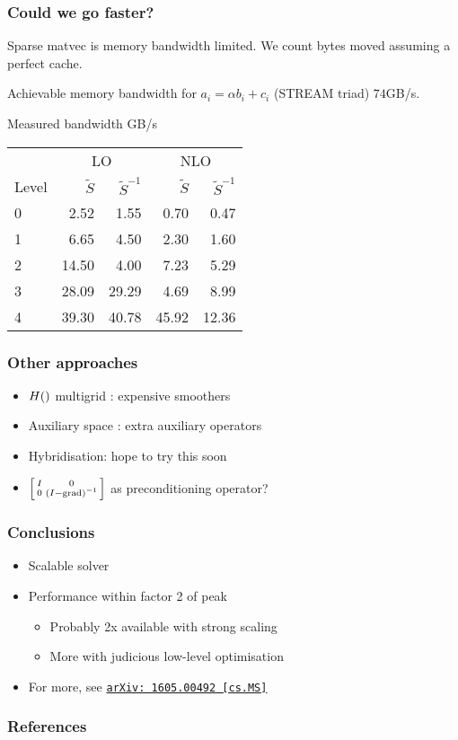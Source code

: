 \documentclass[presentation]{beamer}
\DeclareMathOperator{\grad}{grad}
\let\div\relax
\DeclareMathOperator{\div}{div}
\newcommand{\arxivlink}[2]{%
  \href{http://www.arxiv.org/abs/#1}%
  {{\small\texttt{arXiv:\,#1\,[#2]}}}%
}
\begin{document}
\begin{frame}
  \frametitle{Could we go faster?}
  Sparse matvec is memory bandwidth limited.  We count bytes moved
  assuming a perfect cache.

  Achievable memory bandwidth for $a_i = \alpha b_i + c_i$ (STREAM triad) $74$GB/s.

  \begin{block}{Measured bandwidth GB/s}
    \begin{center}
      \begin{tabular}{lrrrr}
        & \multicolumn{2}{c}{LO} & \multicolumn{2}{c}{NLO}\\
        Level & $\tilde{S}$ & $\tilde{S}^{-1}$ & $\tilde{S}$ & $\tilde{S}^{-1}$\\
        0  &   2.52 &   1.55 &    0.70 &   0.47\\
        1  &   6.65 &   4.50 &    2.30 &   1.60\\
        2  &  14.50 &   4.00 &    7.23 &   5.29\\
        3  &  28.09 &  29.29 &    4.69 &   8.99\\
        4  &  39.30 &  40.78 &   45.92 &  12.36\\
      \end{tabular}
    \end{center}
  \end{block}
\end{frame}

\begin{frame}
  \frametitle{Other approaches}
  \begin{itemize}
  \item $H(\div)$ multigrid \parencite{Arnold:2000}: expensive smoothers
  \item Auxiliary space \parencite{Hiptmair:2007}: extra auxiliary
    operators
  \item Hybridisation: hope to try this soon
  \item $\Bigl[\begin{smallmatrix}
          I & 0 \\
          0 & (I - \div \grad)^{-1}\\
        \end{smallmatrix}\Bigr]$ as preconditioning operator?
  \end{itemize}
\end{frame}

\begin{frame}
  \frametitle{Conclusions}
  \begin{itemize}
  \item Scalable solver
  \item Performance within factor 2 of peak
    \begin{itemize}
    \item Probably 2x available with strong scaling
    \item More with judicious low-level optimisation
    \end{itemize}
  \item For more, see \textcite{Mitchell:2016} \arxivlink{1605.00492}{cs.MS}
  \end{itemize}
\end{frame}

\appendix
\begin{frame}[allowframebreaks]
  \frametitle{References}
  \printbibliography[heading=none]
\end{frame}
\end{document}
